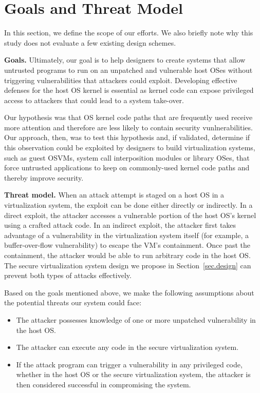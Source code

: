 \section{Goals and Threat Model}
\label{sec.motivation-and-background}

In this section, we define the scope of our efforts. We also briefly note why
this study does not evaluate a few existing design schemes.

\noindent
\textbf{Goals.}
Ultimately, our goal is to help designers to
create systems that allow untrusted programs to 
run on an unpatched and vulnerable host OSes 
 without triggering vulnerabilities that attackers could exploit.
Developing effective defenses for the host OS kernel is essential as kernel code
can expose privileged access to attackers that could lead to a system take-over.

Our hypothesis was that OS kernel code paths that are frequently used receive
more
attention and therefore are less likely to contain security vunlnerabilities.
Our approach, then, was to test this hypothesis and, if validated, determine
if this observation could be exploited by designers to build 
virtualization systems, such as guest OSVMs, system call interposition modules
or library OSes, that force untrusted applications to keep on commonly-used kernel
code paths and thereby improve security.



\noindent
\textbf{Threat model.}
When an attack attempt is staged
on a host OS in a virtualization system,
the exploit can be done either directly or indirectly.
In a direct exploit, the attacker accesses a vulnerable portion of the host OS's kernel
using a crafted attack code. In an indirect exploit,
the attacker first takes advantage of a vulnerability in the virtualization system itself
(for example, a buffer-over-flow vulnerability)
to escape the VM's containment. Once past the containment, the attacker would be able to run arbitrary code
in the host OS.
The secure virtualization system design we propose
in Section~\ref{sec.design} can prevent both types of attacks effectively.

Based on the goals mentioned above, we make the following assumptions about the
potential threats our system could face:

\begin{itemize}\setlength\itemsep{0em}

\item The attacker possesses knowledge of one or more unpatched
vulnerability in the host OS.

\item The attacker can execute any code in the secure
virtualization system.

\item If the attack program can trigger a vulnerability in any privileged
code, whether in the host OS or the secure virtualization system, the attacker
is then considered successful in compromising the system.

\end{itemize}

